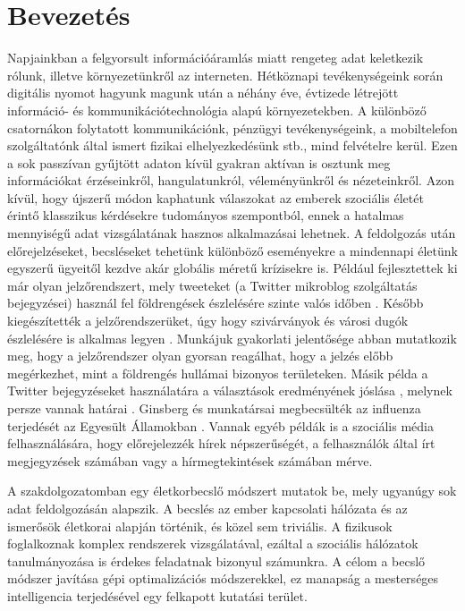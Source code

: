\documentclass[12pt]{article}
\begin{document}
\section{Bevezetés}
Napjainkban a felgyorsult információáramlás miatt rengeteg adat keletkezik rólunk, illetve környezetünkről az interneten.
Hétköznapi tevékenységeink során digitális nyomot hagyunk magunk után a néhány éve, évtizede létrejött információ- és kommunikációtechnológia alapú környezetekben.
A különböző csatornákon folytatott kommunikációnk, pénzügyi tevékenységeink, a mobiltelefon szolgáltatónk által ismert fizikai elhelyezkedésünk stb., mind felvételre kerül.
Ezen a sok passzívan gyűjtött adaton kívül gyakran aktívan is osztunk meg információkat érzéseinkről, hangulatunkról, véleményünkről és nézeteinkről.
Azon kívül, hogy újszerű módon kaphatunk válaszokat az emberek szociális életét érintő klasszikus kérdésekre tudományos szempontból, ennek a hatalmas mennyiségű adat vizsgálatának hasznos alkalmazásai lehetnek. A feldolgozás után előrejelzéseket, becsléseket tehetünk különböző eseményekre a mindennapi életünk egyszerű ügyeitől kezdve akár globális méretű krízisekre is.
Például fejlesztettek ki már olyan jelzőrendszert, mely tweeteket (a Twitter mikroblog szolgáltatás bejegyzései) használ fel földrengések észlelésére szinte valós időben \cite{sakaki2010earthquake}.
Később kiegészítették a jelzőrendszerüket, úgy hogy szivárványok és városi dugók észlelésére is alkalmas legyen \cite{sakaki2013tweet}. Munkájuk gyakorlati jelentősége abban mutatkozik meg, hogy a jelzőrendszer olyan gyorsan reagálhat, hogy a jelzés előbb megérkezhet, mint a földrengés hullámai bizonyos területeken.
Másik példa a Twitter bejegyzéseket használatára a választások eredményének jóslása \cite{tumasjan2010predicting}, melynek persze vannak határai \cite{gayo2011limits, gayo2012wanted}.
Ginsberg és munkatársai megbecsülték az influenza terjedését az Egyesült Államokban \cite{ginsberg2009detecting}. Vannak egyéb példák is a szociális média felhasználására, hogy előrejelezzék hírek népszerűségét, a felhasználók által írt megjegyzések számában \cite{tsagkias2009predicting, tsagkias2010news} vagy a hírmegtekintések számában \cite{castillo2014characterizing} mérve.
\cite{bigData_wikipedia}

A szakdolgozatomban egy életkorbecslő módszert mutatok be, mely ugyanúgy sok adat feldolgozásán alapszik. A becslés az ember kapcsolati hálózata és az ismerősök életkorai alapján történik, és közel sem triviális. A fizikusok foglalkoznak komplex rendszerek vizsgálatával, ezáltal a szociális hálózatok tanulmányozása is érdekes feladatnak bizonyul számunkra. A célom a becslő módszer javítása gépi optimalizációs módszerekkel, ez manapság a mesterséges intelligencia terjedésével egy felkapott kutatási terület. %
\end{document}
